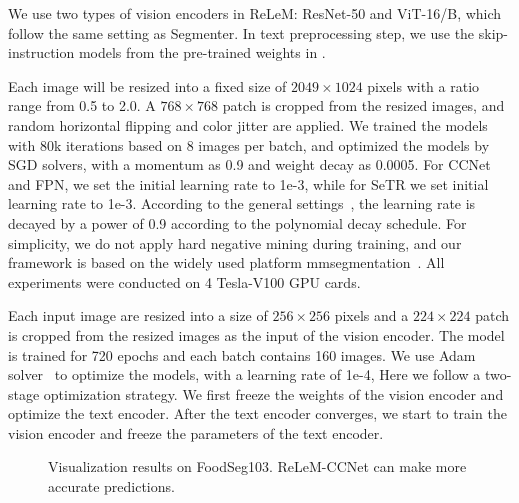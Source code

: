  We use two types of vision encoders in ReLeM: ResNet-50 and ViT-16/B, which follow the same setting as Segmenter. In text preprocessing step, we use the skip-instruction models from the pre-trained weights in \cite{Salvador-LCME-arXiv2018}.

 Each image will be resized into a fixed size of $2049 \times 1024$ pixels with a ratio range from 0.5 to 2.0. A $768 \times 768$ patch is cropped from the resized images, and random horizontal flipping and color jitter are applied. We trained the models with 80k iterations based on 8 images per batch, and optimized the models by SGD solvers, with a momentum as 0.9 and weight decay as 0.0005. For CCNet and FPN, we set the initial learning rate to 1e-3, while for SeTR we set initial learning rate to 1e-3. According to the general settings~\cite{wang2021pyramid,huang2018ccnet}, the learning rate is decayed by a power of 0.9 according to the polynomial decay schedule. For simplicity, we do not apply hard negative mining during training, and our framework is based on the widely used platform mmsegmentation~\cite{mmseg2020}. All experiments were conducted on 4 Tesla-V100 GPU cards.

 Each input image are resized into a size of $256 \times 256$ pixels and a $224 \times 224$ patch is cropped from the resized images as the input of the vision encoder. The model is trained for 720 epochs and each batch contains 160 images. We use Adam solver~\cite{kingma2014adam} to optimize the models, with a learning rate of 1e-4, Here we follow a two-stage optimization strategy. We first freeze the weights of the vision encoder and optimize the text encoder. After the text encoder converges, we start to train the vision encoder and freeze the parameters of the text encoder.

\begin{figure*}[t]
	\centering
	\caption{Visualization results on FoodSeg103. ReLeM-CCNet can make more accurate predictions.} 	\label{fig:vis}
\end{figure*} 

